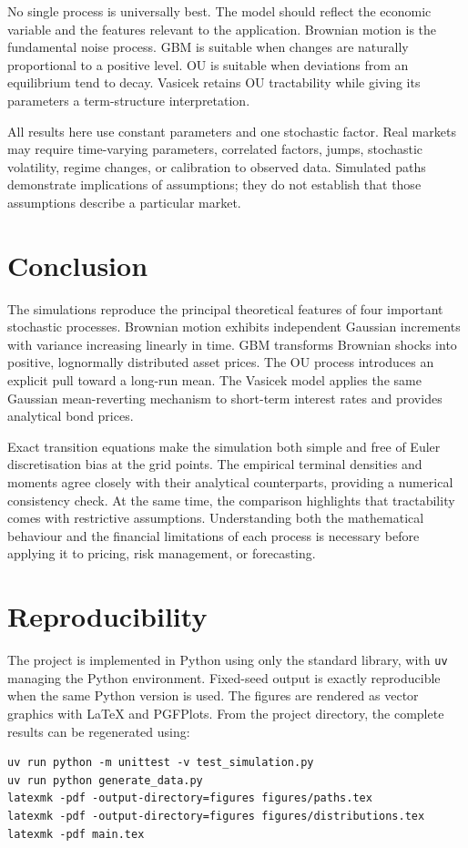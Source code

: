 \documentclass[11pt,a4paper]{article}
\begin{document}
No single process is universally best. The model should reflect the economic variable and the features relevant to the application. Brownian motion is the fundamental noise process. GBM is suitable when changes are naturally proportional to a positive level. OU is suitable when deviations from an equilibrium tend to decay. Vasicek retains OU tractability while giving its parameters a term-structure interpretation.

All results here use constant parameters and one stochastic factor. Real markets may require time-varying parameters, correlated factors, jumps, stochastic volatility, regime changes, or calibration to observed data. Simulated paths demonstrate implications of assumptions; they do not establish that those assumptions describe a particular market.

\section{Conclusion}

The simulations reproduce the principal theoretical features of four important stochastic processes. Brownian motion exhibits independent Gaussian increments with variance increasing linearly in time. GBM transforms Brownian shocks into positive, lognormally distributed asset prices. The OU process introduces an explicit pull toward a long-run mean. The Vasicek model applies the same Gaussian mean-reverting mechanism to short-term interest rates and provides analytical bond prices.

Exact transition equations make the simulation both simple and free of Euler discretisation bias at the grid points. The empirical terminal densities and moments agree closely with their analytical counterparts, providing a numerical consistency check. At the same time, the comparison highlights that tractability comes with restrictive assumptions. Understanding both the mathematical behaviour and the financial limitations of each process is necessary before applying it to pricing, risk management, or forecasting.

\appendix
\section{Reproducibility}

The project is implemented in Python using only the standard library, with \texttt{uv} managing the Python environment. Fixed-seed output is exactly reproducible when the same Python version is used. The figures are rendered as vector graphics with LaTeX and PGFPlots. From the project directory, the complete results can be regenerated using:
\begin{verbatim}
uv run python -m unittest -v test_simulation.py
uv run python generate_data.py
latexmk -pdf -output-directory=figures figures/paths.tex
latexmk -pdf -output-directory=figures figures/distributions.tex
latexmk -pdf main.tex
\end{verbatim}
\end{document}
